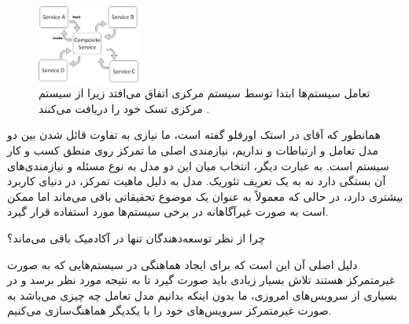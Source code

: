 \documentclass[a4paper]{article}
\begin{document}
\begin{figure}[H]
    \centering
    \includegraphics[width=0.3\textwidth]{orchestration.jpeg}
    \caption{تعامل سیستم‌ها ابتدا توسط سیستم مرکزی اتفاق می‌افتد زیرا از سیستم
    مرکزی تسک خود را دریافت می‌کنند \cite{stackoverflow}.}
    \label{fig:atmDiagram}
\end{figure}

همانطور که آقای  \cite{karelhusaOpinion} در استک اورفلو گفته است،
ما نیازی به تفاوت قائل شدن بین دو مدل تعامل و ارتباطات  و
 نداریم، نیازمندی اصلی ما تمرکز روی منطق کسب و کار سیستم است.
به عبارت دیگر، انتخاب میان این دو مدل به نوع مسئله و نیازمندی‌های آن بستگی دارد
نه به یک تعریف تئوریک. مدل  به دلیل ماهیت تمرکز، در دنیای
 کاربرد بیشتری دارد، در حالی که  معمولاً به عنوان یک
موضوع تحقیقاتی باقی می‌ماند اما ممکن است به صورت غیرآگاهانه در برخی سیستم‌ها
مورد استفاده قرار گیرد.

چرا  از نظر توسعه‌دهندگان تنها در آکادمیک باقی می‌ماند؟

دلیل اصلی آن این است که برای ایجاد هماهنگی در سیستم‌هایی که به صورت غیرمتمرکز
هستند تلاش بسیار زیادی باید صورت گیرد تا به نتیجه مورد نظر برسد و در بسیاری از
سرویس‌های امروزی، ما بدون اینکه بدانیم مدل تعامل  چه چیزی
می‌باشد به صورت غیرمتمرکز سرویس‌های خود را با یکدیگر هماهنگ‌سازی می‌کنیم.



\end{document}
